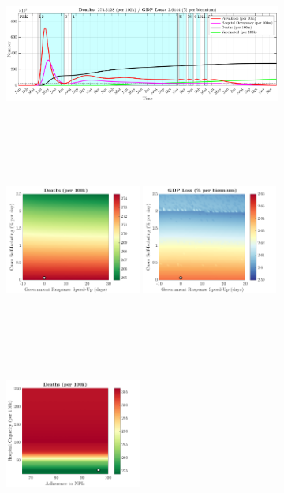 \documentclass[paper=a4, fontsize=11pt]{scrartcl}
\numberwithin{figure}{section}
\numberwithin{table}{section}
\begin{document}
\begin{figure}[H]
\centering
    \begin{subfigure}[b]{\textwidth}
     	\includegraphics[width=\textwidth,height=5.5cm]{Counterfactuals/IN_cv19}
    \end{subfigure}
    \begin{subfigure}[b]{\textwidth}
      	\includegraphics[width=0.49\textwidth,height=6cm]{IN/COVID/ero_d}
	\hspace{0.05cm}
    	\includegraphics[width=0.49\textwidth,height=6cm]{IN/COVID/ero_g}
    \end{subfigure}
    \begin{subfigure}[b]{\textwidth}
      	\includegraphics[width=0.49\textwidth,height=6cm]{IN/COVID/npl_d}

\end{subfigure}
\end{figure}
\end{document}
